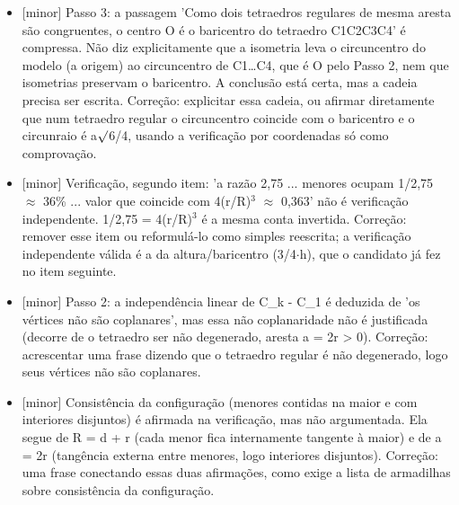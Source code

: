 \documentclass{article}%
\begin{document}
\begin{itemize}%
\item%
{[}minor{]} Passo 3: a passagem 'Como dois tetraedros regulares de mesma aresta são congruentes, o centro O é o baricentro do tetraedro C1C2C3C4' é compressa. Não diz explicitamente que a isometria leva o circuncentro do modelo (a origem) ao circuncentro de C1\ldots{}C4, que é O pelo Passo 2, nem que isometrias preservam o baricentro. A conclusão está certa, mas a cadeia precisa ser escrita. Correção: explicitar essa cadeia, ou afirmar diretamente que num tetraedro regular o circuncentro coincide com o baricentro e o circunraio é a$\surd$6/4, usando a verificação por coordenadas só como comprovação.%
\item%
{[}minor{]} Verificação, segundo item: 'a razão 2,75 ... menores ocupam 1/2,75 $\approx$ 36\% ... valor que coincide com 4(r/R)$^3$ $\approx$ 0,363' não é verificação independente. 1/2,75 = 4(r/R)$^3$ é a mesma conta invertida. Correção: remover esse item ou reformulá{-}lo como simples reescrita; a verificação independente válida é a da altura/baricentro (3/4$\cdot$h), que o candidato já fez no item seguinte.%
\item%
{[}minor{]} Passo 2: a independência linear de C\_k - C\_1 é deduzida de 'os vértices não são coplanares', mas essa não coplanaridade não é justificada (decorre de o tetraedro ser não degenerado, aresta a = 2r > 0). Correção: acrescentar uma frase dizendo que o tetraedro regular é não degenerado, logo seus vértices não são coplanares.%
\item%
{[}minor{]} Consistência da configuração (menores contidas na maior e com interiores disjuntos) é afirmada na verificação, mas não argumentada. Ela segue de R = d + r (cada menor fica internamente tangente à maior) e de a = 2r (tangência externa entre menores, logo interiores disjuntos). Correção: uma frase conectando essas duas afirmações, como exige a lista de armadilhas sobre consistência da configuração.%
\end{itemize}%
\end{document}
